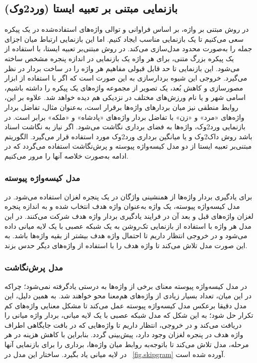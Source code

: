 \subsection{بازنمایی مبتنی ‌بر تعبیه ایستا (ورد2وک)}
در روش مبتنی ‌بر واژه،  بر اساس فراوانی و توالی واژه‌های استفاده‌شده در یک پیکره سعی می‌کنیم تا یک بازنمایی مناسب ایجاد کنیم. اما این بازنمایی ارتباط میان اجزای جمله را به‌صورت محدود مدل‌سازی می‌کند. در روش مبتنی‌بر تعبیه ایستا، با استفاده از یک پیکره بزرگ متنی، برای هر واژه یک بازنمایی در اندازه پنجره مشخص ساخته می‌شود. این بازنمایی تا حد قابل قبولی مفاهیم هر واژه را در ساخت بردار در نظر می‌گیرد. خروجی این شیوه بردارسازی به این صورت است که اگر با استفاده از ابزار مصورسازی و کاهش بُعد، یک تصویر از مجموعه واژه‌های یک پیکره را داشته باشیم، اسامی شهر و یا نام ورزش‌های مختلف در نزدیکی هم دیده خواهد شد. علاوه بر این، روابط منطقی نیز میان بردارهای واژه‌ها برقرار است، به‌عنوان مثال، تفاضل بردار واژه‌های «مرد» و «زن» با تفاضل بردار واژه‌های «پادشاه» و «ملکه» برابر است. در بازنمایی ورد2وک، واژه‌ها به فضای برداری نگاشت می‌شود. اگر نیاز به نگاشت اسناد باشد روش داک2وک و یا میانگین برداری ورد2وک مورد استفاده قرار می‌گیرد. الگوریتم مبتنی‌بر تعبیه ایستا از دو مدل کیسه‌واژه پیوسته و پرش‌نگاشت\citep{mikolov2013distributed} استفاده می‌گردد که در ادامه به‌صورت خلاصه آنها را مرور می‌کنیم.

\subsubsection{مدل کیسه‌واژه پیوسته}
برای یادگیری بردار واژه‌ها از همنشینی واژگان در یک پنجره لغزان استفاده می‌شود. در مدل کیسه‌واژه پیوسته، یک واژه به‌عنوان واژه هدف انتخاب شده و به اندازه پنجره لغزان واژه‌های قبل و بعد آن در فرایند یادگیری بردار واژه هدف شرکت می‌کنند. در این مدل هر واژه با استفاده از بازنمایی تک‌روشن به یک شبکه عصبی با یک لایه میانی داده می‌شود و در خروجی انتظار داریم تا احتمال واژه هدف بیشتر از بقیه واژه‌ها باشد. به این صورت مدل  تلاش می‌کند تا واژه هدف را با استفاده از واژه‌های دیگر حدس بزند.

\subsubsection{مدل پرش‌نگاشت}
در مدل کیسه‌واژه پیوسته معنای برخی از واژه‌ها به درستی یادگرفته نمی‌شود؛ چراکه در این میان، تعداد بسیار زیادی از واژه‌های هم‌معنا محو خواهند شد. به همین دلیل، این مدل دقیقا برعکس مدل کیسه‌واژه پیوسته عمل می‌کند تا مشکل معنایی واژه‌های کم تکرار حل شود؛ به این شکل که مدل شبکه عصبی با یک لایه میانی، بردار واژه میانی را دریافت می‌کند و در خروجی، انتظار داریم تا واژه‌هایی که در بافت جایگاهی اطراف واژه هدف در پنجره لغزان وجود دارد، پیش‌بینی گردد. بنابراین با کاهش هزینه در هر مرحله، مدل تلاش می‌کند تا باتوجه‌به روابط میان واژه‌ها، برداری را برای بازنمایی آنها در لایه میانی یاد بگیرد. ساختار این مدل در \figurename~\ref{fig.skipgram} آورده شده ‌است.

